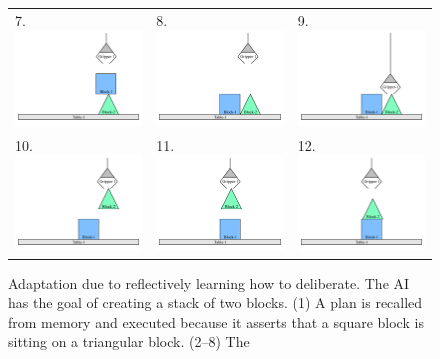 \begin{figure}
\begin{tabular}{p{3.5cm}p{3.5cm}p{3.5cm}}
7. \includegraphics[width=3.5cm]{gfx/blocks_world_example-7}  & 8. \includegraphics[width=3.5cm]{gfx/blocks_world_example-8}  & 9. \includegraphics[width=3.5cm]{gfx/blocks_world_example-9} \\
10. \includegraphics[width=3.5cm]{gfx/blocks_world_example-10} & 11. \includegraphics[width=3.5cm]{gfx/blocks_world_example-11} & 12. \includegraphics[width=3.5cm]{gfx/blocks_world_example-12}
\end{tabular}
\caption[Adaptation due to reflectively learning how to
  deliberate.]{Adaptation due to reflectively learning how to
  deliberate.  The AI has the goal of creating a stack of two blocks.
  (1) A plan is recalled from memory and executed because it asserts
  that a square block is sitting on a triangular block.  (2--8) The
}
\end{figure}
